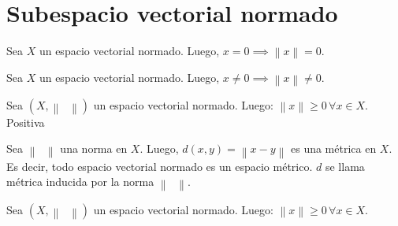 \section{Subespacio vectorial normado}

\begin{prob}
	\label{prob1}
	Sea $X$ un espacio vectorial normado.
	Luego,
	\begin{math}
		x=
		0\implies
		\left\|
		x
		\right\|=
		0
	\end{math}.
\end{prob}

\begin{prob}
	\label{prob2}
	Sea $X$ un espacio vectorial normado.
	Luego,
	\begin{math}
		x\neq
		0\implies
		\left\|
		x
		\right\|\neq
		0
	\end{math}.
\end{prob}

\begin{prob}
	\label{prob3}
	Sea
	\begin{math}
		\left(
		X,
		\left\|
		\phantom{\cdot}
		\right\|
		\right)
	\end{math}
	un espacio vectorial normado.
	Luego:
	\begin{math}
		\left\|
		x
		\right\|\geq
		0\,
		\forall x\in X
	\end{math}.
	\hfill
	Positiva
\end{prob}

\begin{prob}
	\label{prob4}
	Sea
	\begin{math}
		\left\|
		\phantom{\cdot}
		\right\|
	\end{math}
	una norma en $X$.
	Luego,
	\begin{math}
		d\left(x,y\right)=
		\left\|
		x-y
		\right\|
	\end{math}
	es una métrica en $X$.
	Es decir, todo espacio vectorial normado es un espacio métrico.
	$d$ se llama métrica inducida por la norma
	\begin{math}
		\left\|
		\phantom{\cdot}
		\right\|
	\end{math}.
\end{prob}


\begin{prob}
	\label{prob5}
	Sea
	\begin{math}
		\left(
		X,
		\left\|
		\phantom{\cdot}
		\right\|
		\right)
	\end{math}
	un espacio vectorial normado.
	Luego:
	\begin{math}
		\left\|
		x
		\right\|\geq
		0\,\forall
		x\in X
	\end{math}.
\end{prob}

